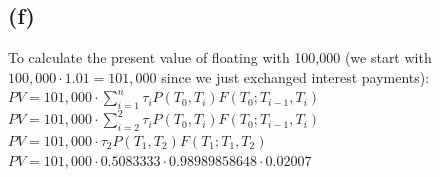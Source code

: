 \documentclass{article}
\begin{document}
{\subsection*{(f)}

To calculate the present value of floating with 100,000 (we start with $100,000 \cdot 1.01 = 101,000$ since we just exchanged interest payments): \\
$PV = 101,000 \cdot \sum_{i=1}^{n} \tau_i P(T_0, T_i) F(T_0; T_{i-1}, T_i)$ \\
$PV = 101,000 \cdot \sum_{i=2}^{2} \tau_i P(T_0, T_i) F(T_0; T_{i-1}, T_i)$ \\
$PV = 101,000 \cdot \tau_2 P(T_1, T_2) F(T_1; T_1, T_2)$ \\
$PV = 101,000 \cdot 0.5083333 \cdot 0.98989858648 \cdot 0.02007$ \\

}
\end{document}
